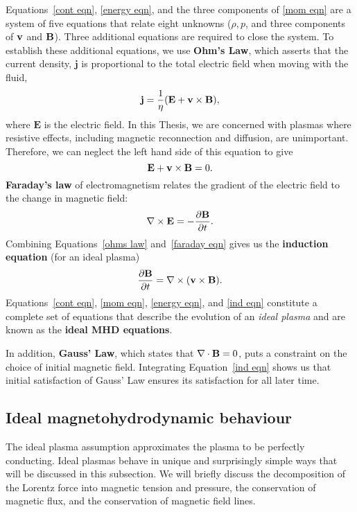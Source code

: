 \documentclass[12pt]{../style-files/ociamthesis}
\begin{document}
Equations~\eqref{cont eqn}, \eqref{energy eqn}, and the three components of \eqref{mom eqn} are a system of five equations that relate eight unknowns ($\rho, p$, and three components of $\mathbf{v}$ and $\mathbf{B}$). Three additional equations are required to close the system. To establish these additional equations, we use \textbf{Ohm's Law}, which asserts that the current density, $\mathbf{j}$ is proportional to the total electric field when moving with the fluid,
\begin{equation}
	\mathbf{j} = \frac{1}{\eta}(\mathbf{E} + \mathbf{v}\times\mathbf{B}),
\end{equation}
where $\mathbf{E}$ is the electric field. In this Thesis, we are concerned with plasmas where resistive effects, including magnetic reconnection and diffusion, are unimportant. Therefore, we can neglect the left hand side of this equation to give
\begin{equation}
\mathbf{E} + \mathbf{v}\times\mathbf{B} = 0. \label{ohms law}
\end{equation}
\textbf{Faraday's law} of electromagnetism relates the gradient of the electric field to the change in magnetic field:
\begin{equation}
	\nabla\times\mathbf{E} = -\frac{\partial\mathbf{B}}{\partial t}. \label{faraday eqn}
\end{equation}
Combining Equations~\eqref{ohms law} and~\eqref{faraday eqn} gives us the \textbf{induction equation} (for an ideal plasma)
\begin{equation}
	\frac{\partial\mathbf{B}}{\partial t} = \nabla\times(\mathbf{v}\times\mathbf{B}). \label{ind eqn}
\end{equation}
Equations~\eqref{cont eqn}, \eqref{mom eqn}, \eqref{energy eqn}, and \eqref{ind eqn} constitute a complete set of equations that describe the evolution of an \textit{ideal plasma} and are known as the \textbf{ideal MHD equations}.

In addition, \textbf{Gauss' Law}, which states that $\nabla\cdot\mathbf{B} = 0$, puts a constraint on the choice of initial magnetic field. Integrating Equation~\eqref{ind eqn} shows us that initial satisfaction of Gauss' Law ensures its satisfaction for all later time.


\subsection{Ideal magnetohydrodynamic behaviour}
The ideal plasma assumption approximates the plasma to be perfectly conducting. Ideal plasmas behave in unique and surprisingly simple ways that will be discussed in this subsection. We will briefly discuss the decomposition of the Lorentz force into magnetic tension and pressure, the conservation of magnetic flux, and the conservation of magnetic field lines.
\end{document}

